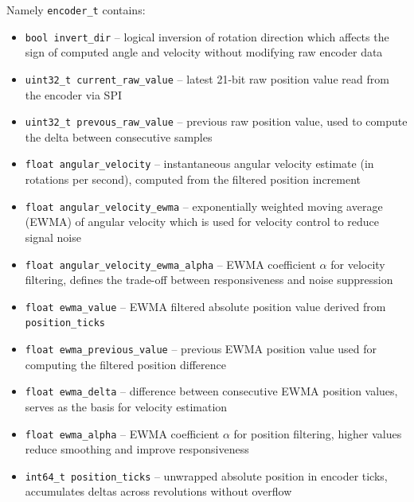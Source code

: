 Namely \texttt{encoder\_t} contains:
\begin{itemize}
\item \verb|bool invert_dir| -- logical inversion of rotation direction which affects the sign of computed 
                                angle and velocity without modifying raw encoder data

\item \verb|uint32_t current_raw_value| -- latest 21-bit raw position value read from the encoder via SPI

\item \verb|uint32_t prevous_raw_value| -- previous raw position value, used to compute the delta between consecutive samples

\item \verb|float angular_velocity| -- instantaneous angular velocity estimate (in rotations per second), 
                                        computed from the filtered position increment

\item \verb|float angular_velocity_ewma| -- exponentially weighted moving average (EWMA) of angular velocity
                                            which is used for velocity control to reduce signal noise

\item \verb|float angular_velocity_ewma_alpha| -- EWMA coefficient $\alpha$ for velocity filtering,
                                                 defines the trade-off between responsiveness and noise suppression

\item \verb|float ewma_value| -- EWMA filtered absolute position value derived from \verb|position_ticks|

\item \verb|float ewma_previous_value| -- previous EWMA position value used for computing the filtered position difference

\item \verb|float ewma_delta| -- difference between consecutive EWMA position values, serves as the basis for velocity estimation

\item \verb|float ewma_alpha| -- EWMA coefficient $\alpha$ for position filtering, higher values reduce smoothing and improve responsiveness

\item \verb|int64_t position_ticks| -- unwrapped absolute position in encoder ticks, accumulates deltas across revolutions without overflow


\end{itemize}
